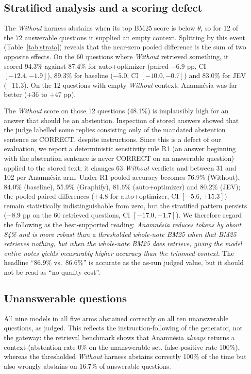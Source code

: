\documentclass[conference,onecolumn,11pt]{IEEEtran}
\newcommand{\anam}{Anam\-n\'esia}
\begin{document}


\subsection{Stratified analysis and a scoring defect}\label{sec:strata}
The \emph{Without} harness abstains when its top BM25 score is below $\theta$, so for 12 of the 72 answerable questions it supplied an empty context. Splitting by this event (Table~\ref{tab:strata}) reveals that the near-zero pooled difference is the sum of two opposite effects. On the 60 questions where \emph{Without} retrieved something, it scored 94.3\% against 87.4\% for auto+optimizer (paired $-6.9$ pp, CI $[-12.4,-1.9]$), 89.3\% for baseline ($-5.0$, CI $[-10.0,-0.7]$) and 83.0\% for JEV ($-11.3$). On the 12 questions with empty \emph{Without} context, \anam{} was far better (+36 to +47 pp).

The \emph{Without} score on those 12 questions (48.1\%) is implausibly high for an answer that should be an abstention. Inspection of stored answers showed that the judge labelled some replies consisting only of the mandated abstention sentence as CORRECT, despite instructions. Since this is a defect of our evaluation, we report a deterministic sensitivity rule R1 (an answer beginning with the abstention sentence is never CORRECT on an answerable question) applied to the stored text; it changes 63 \emph{Without} verdicts and between 31 and 102 per \anam{} arm. Under R1 pooled accuracy becomes 76.9\% (Without), 84.0\% (baseline), 55.9\% (Graphify), 81.6\% (auto+optimizer) and 80.2\% (JEV); the pooled paired differences ($+4.8$ for auto+optimizer, CI $[-5.6,+15.3]$) remain statistically indistinguishable from zero, but the stratified pattern persists ($-8.9$ pp on the 60 retrieved questions, CI $[-17.0,-1.7]$). We therefore regard the following as the best-supported reading: \emph{\anam{} reduces tokens by about 84\% and is more robust than a thresholded whole-note BM25 when that BM25 retrieves nothing, but when the whole-note BM25 does retrieve, giving the model entire notes yields measurably higher accuracy than the trimmed context}. The headline ``86.9\% vs.\ 86.6\%'' is accurate as the as-run judged value, but it should not be read as ``no quality cost''.

\subsection{Unanswerable questions}
All nine models in all five arms abstained correctly on all ten unanswerable questions, as judged. This reflects the instruction-following of the generator, not the gateway: the retrieval benchmark shows that \anam{} \emph{always} returns a context (abstention rate 0\% on the unanswerable set, false-positive rate 100\%), whereas the thresholded \emph{Without} harness abstains correctly 100\% of the time but also wrongly abstains on 16.7\% of answerable questions.
\end{document}
